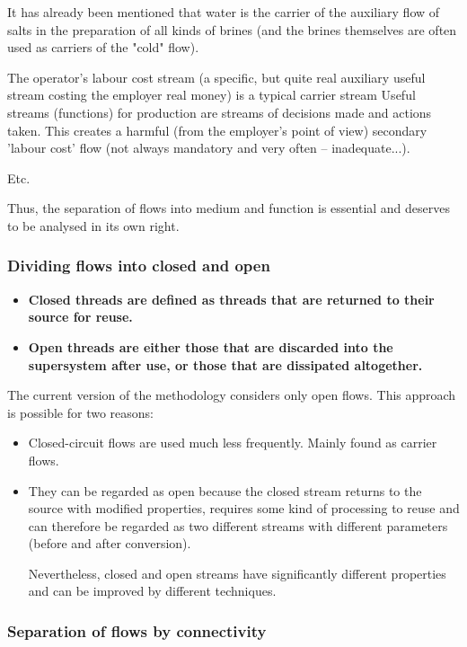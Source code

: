 \documentclass[a4paper,11pt]{article}
\begin{document}
It has already been mentioned that water is the carrier of the auxiliary flow
of salts in the preparation of all kinds of brines (and the brines themselves
are often used as carriers of the "cold" flow).

The operator's labour cost stream (a specific, but quite real auxiliary useful
stream costing the employer real money) is a typical carrier stream Useful
streams (functions) for production are streams of decisions made and actions
taken. This creates a harmful (from the employer's point of view) secondary
'labour cost' flow (not always mandatory and very often -- inadequate...).

Etc.

Thus, the separation of flows into medium and function is essential and
deserves to be analysed in its own right.

\subsubsection{Dividing flows into closed and open}
\begin{itemize}
\item \textbf{Closed threads are defined as threads that are returned to their
  source for reuse.}
\item \textbf{Open threads are either those that are discarded into the
  supersystem after use, or those that are dissipated altogether.}
\end{itemize}
The current version of the methodology \cite{B9} considers only open flows.
This approach is possible for two reasons:
\begin{itemize}
\item Closed-circuit flows are used much less frequently. Mainly found as
  carrier flows.
\item They can be regarded as open because the closed stream returns to the
  source with modified properties, requires some kind of processing to reuse
  and can therefore be regarded as two different streams with different
  parameters (before and after conversion).

  Nevertheless, closed and open streams have significantly different
  properties and can be improved by different techniques.
\end{itemize}

\subsubsection{Separation of flows by connectivity}
\end{document}
